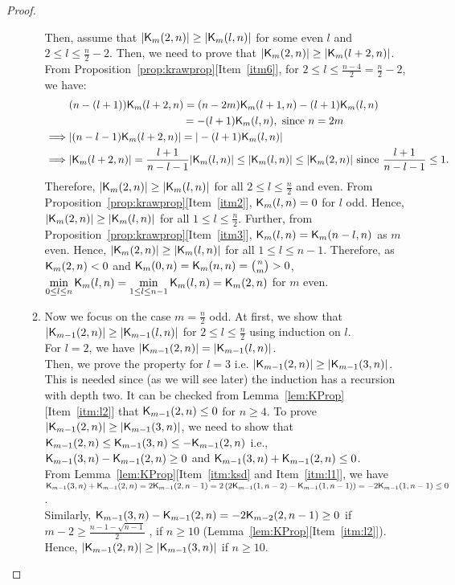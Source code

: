 \documentclass{llncs}
\begin{document}
\begin{proof}
\begin{enumerate}
\begin{enumerate}
Then, assume that $|\mathsf{K}_{m}(2,n)| \geq |\mathsf{K}_{m}(l,n)|$ for some even $l$ and $2 \leq l \leq \frac{n}{2}-2$. Then, we need to prove that $|\mathsf{K}_{m}(2,n)| \geq |\mathsf{K}_{m}(l+2,n)|$.
From Proposition~\ref{prop:krawprop}[Item~\ref{itm6}], for $2 \leq l \leq \frac{n-4}{2} = \frac{n}{2}-2$, we have:
\begin{align*}
& (n-(l+1)) \mathsf{K}_{m}(l+2,n) = (n-2m) \mathsf{K}_{m}(l+1,n) - (l+1)\mathsf{K}_{m}(l,n) \\
& ~~~~~~~~~~~~~~~~~~~~~~~~~~~~~~~~=  - (l+1)\mathsf{K}_{m}(l,n), \mbox{ since } n = 2m \\
\implies & |(n-l-1) \mathsf{K}_{m}(l+2,n)| = |-(l+1) \mathsf{K}_{m}(l,n)| \\
\implies & |\mathsf{K}_{m}(l+2,n)| = \frac{l+1}{n-l-1} |\mathsf{K}_{m}(l,n)|  \leq |\mathsf{K}_{m}(l,n)| \leq |\mathsf{K}_{m}(2,n)| \text{ since } \frac{l+1}{n-l-1} \leq 1.
\end{align*}
Therefore, $|\mathsf{K}_{m}(2,n)| \geq |\mathsf{K}_{m}(l,n)|$ for all $2 \leq l \leq \frac{n}{2}$ and even. From Proposition~\ref{prop:krawprop}[Item~\ref{itm2}], $\mathsf{K}_{m}(l,n) = 0$ for $l$ odd. Hence, $|\mathsf{K}_{m}(2,n)| \geq |\mathsf{K}_{m}(l,n)|$ for all $1 \leq l \leq \frac{n}{2}$. Further, from Proposition~\ref{prop:krawprop}[Item~\ref{itm3}], $\mathsf{K}_{m}(l,n) = \mathsf{K}_{m}(n-l,n)$ as $m$ even. Hence, $|\mathsf{K}_{m}(2,n)| \geq |\mathsf{K}_{m}(l,n)|$ for all $1 \leq l \leq n-1$.
Therefore, as $\mathsf{K}_{m}(2,n) < 0$ and $\mathsf{K}_{m}(0,n) = \mathsf{K}_{m}(n,n) = {n \choose m} > 0$, $\min\limits_{0 \leq l \leq n }\mathsf{K}_{m}(l,n)= \min\limits_{1 \leq l \leq n-1}\mathsf{K}_{m}(l,n) = \mathsf{K}_{m}(2,n)$ for $m$ even.

\item Now we focus on the case $m = \frac{n}{2}$ odd.
At first, we show that $|\mathsf{K}_{m-1}(2,n)| \geq |\mathsf{K}_{m-1}(l,n)|$ for $2 \leq l \leq \frac{n}{2}$ using induction on $l$.\\
For $l = 2$, we have $|\mathsf{K}_{m-1}(2,n)| = |\mathsf{K}_{m-1}(l,n)|$.\\
Then, we prove the property for $l = 3$ i.e. $|\mathsf{K}_{m-1}(2,n)| \geq |\mathsf{K}_{m-1}(3,n)|$. This is needed since (as we will see later) the induction has a recursion with depth two.
It can be checked from Lemma~\ref{lem:KProp}[Item~\ref{itm:l2}] that $\mathsf{K}_{m-1}(2,n) \leq 0$ for  $n \geq 4$. To prove $|\mathsf{K}_{m-1}(2,n)| \geq |\mathsf{K}_{m-1}(3,n)|$, we need to show that $\mathsf{K}_{m-1}(2,n) \leq \mathsf{K}_{m-1}(3,n) \leq -\mathsf{K}_{m-1}(2,n)$ i.e., $\mathsf{K}_{m-1}(3,n)-\mathsf{K}_{m-1}(2,n) \geq 0$ and 
$\mathsf{K}_{m-1}(3,n)+\mathsf{K}_{m-1}(2,n) \leq 0$.\\
From Lemma~\ref{lem:KProp}[Item~\ref{itm:ksd} and Item~\ref{itm:l1}], we have $\mathsf{K}_{m-1}(3,n)+\mathsf{K}_{m-1}(2,n) = 2\mathsf{K}_{m-1}(2,n-1) = 
2\left( 2\mathsf{K}_{m-1}(1,n-2) - \mathsf{K}_{m-1}(1,n-1)\right) = -2\mathsf{K}_{m-1}(1,n-1)
\leq 0$.\\
Similarly, $\mathsf{K}_{m-1}(3,n)-\mathsf{K}_{m-1}(2,n) = -2\mathsf{K}_{m-2}(2,n-1) \geq 0$ if $m-2 \geq \frac{n-1-\sqrt{n-1}}{2}$ \ie, if $n \geq 10$ (Lemma~\ref{lem:KProp}[Item~\ref{itm:l2}]).
Hence, $|\mathsf{K}_{m-1}(2,n)| \geq |\mathsf{K}_{m-1}(3,n)|$ if $n \geq 10$.


\end{enumerate}
\end{enumerate}
\end{proof}
\end{document}
